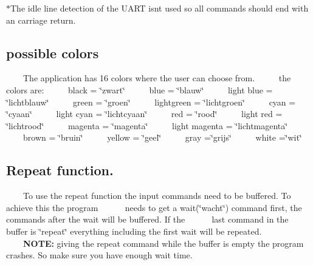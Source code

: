 $\ast$\+The idle line detection of the U\+A\+RT isn\textquotesingle{}t used so all commands should end with an carriage return.\hypertarget{index_colors_sec}{}\subsection{possible colors}\label{index_colors_sec}
~~~~The application has 16 colors where the user can choose from.~\newline
 ~~~~the colors are\+:~\newline
 ~~~~black = \char`\"{}zwart\char`\"{}~\newline
 ~~~~blue = \char`\"{}blauw\char`\"{}~\newline
 ~~~~light blue = \char`\"{}lichtblauw\char`\"{}~\newline
 ~~~~green = \char`\"{}groen\char`\"{}~\newline
 ~~~~lightgreen = \char`\"{}lichtgroen\char`\"{}~\newline
 ~~~~cyan = \char`\"{}cyaan\char`\"{}~\newline
 ~~~~light cyan = \char`\"{}lichtcyaan\char`\"{}~\newline
 ~~~~red = \char`\"{}rood\char`\"{}~\newline
 ~~~~light red = \char`\"{}lichtrood\char`\"{}~\newline
 ~~~~magenta = \char`\"{}magenta\char`\"{}~\newline
 ~~~~light magenta = \char`\"{}lichtmagenta\char`\"{}~\newline
 ~~~~brown = \char`\"{}bruin\char`\"{}~\newline
 ~~~~yellow = \char`\"{}geel\char`\"{}~\newline
 ~~~~gray =\char`\"{}grijs\char`\"{}~\newline
 ~~~~white =\char`\"{}wit\char`\"{}~\newline
\hypertarget{index_repeat_sec}{}\subsection{Repeat function.}\label{index_repeat_sec}
~~~~To use the repeat function the input commands need to be buffered. To achieve this the program ~\newline
 ~~~~needs to get a wait(\char`\"{}wacht\char`\"{}) command first, the commands after the wait will be buffered. If the ~\newline
 ~~~~last command in the buffer is \char`\"{}repeat\char`\"{} everything including the first wait will be repeated.~\newline
~\newline
 ~~~~{\bfseries N\+O\+TE\+:} giving the repeat command while the buffer is empty the program crashes. So make sure you have enough wait time.~\newline
 